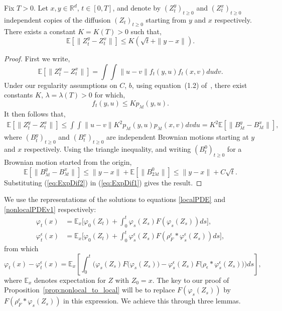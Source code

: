 \documentclass[EJP]{ejpecp} %
\newcommand{\IE}{\mathbb E}
\begin{document}
\begin{lemma} \label{regularityForX2}
Fix $T>0$. Let $x,y \in \mathbb{R}^d$, $t \in [0,T]$, and denote by 
$(Z_t^y)_{t\geq 0}$ and $(Z_t^x)_{t\geq 0}$ independent copies of the 
diffusion $(Z_t)_{t\geq 0}$ starting 
from $y$ and $x$ respectively. There exists a constant $K=K(T)>0$ such that, 
\[ \IE[\|Z_t^y-Z_t^x\|] \leq K(\sqrt{t} + \|y-x\|). \]
\end{lemma}
\begin{proof}
First we write, 
\[ \IE[\|Z_t^y-Z_t^x\|]  = \int \int \|u-v\| f_t(y,u) f_t(x,v) du dv . \]
Under our regularity assumptions on $C$, $b$, using equation~(1.2)
of~\cite{sheu:1991}, there exist constants $K$, $\lambda =\lambda (T)>0$ 
for which,
\[ f_t(y,u) \leq K  p_{\lambda  t}(y,u). \]
It then follows that,
\begin{align}
  \IE[\|Z_t^y-Z_t^x\|]  \leq \int \int \|u-v\| K^2 p_{\lambda  t}(y,u) 
p_{\lambda  t}(x,v) dv du = K^2 \IE[\|B_{\lambda  t}^y-B_{\lambda  t}^x\|], 
\label{eq:ExpDif1}
\end{align}
where $(B_t^y)_{t\geq 0}$ and $(B_t^x)_{t\geq 0}$ are 
independent Brownian motions starting at $y$ and $x$ respectively. 
Using the triangle inequality, and writing $(B^0_t)_{t\geq 0}$ for a 
Brownian motion started from the origin,
\begin{equation}
\IE[\|B_{\lambda  t}^y-B_{\lambda  t}^x\|]
	\leq \|y-x\|+\IE[\|B^0_{2\lambda t}\|] 
\leq \|y-x\|+C\sqrt{t}. \label{eq:ExpDif2}
\end{equation}
Substituting (\ref{eq:ExpDif2}) in (\ref{eq:ExpDif1}) gives the result.
\end{proof}

We use the representations of the solutions to equations \eqref{localPDE} and \eqref{nonlocalPDEv1} respectively:
\begin{align}
\varphi_t(x) &= \IE_x\Big[\varphi_0(Z_t) 
+ \int_0^t \varphi_s(Z_s)F(\varphi_s(Z_s)) ds\Big], \label{FK:varphi} \\
\varphi^\epsilon_t(x) &= \IE_x\Big[\varphi_0(Z_t) 
+ \int_0^t \varphi^\epsilon_s(Z_s)F(\rho^\epsilon_F*\varphi^\epsilon_s(Z_s)) ds\Big],
\end{align}
from which
\begin{equation} 
\varphi_t(x) - \varphi^\epsilon_t(x) = 
\IE_x\left[ \int_0^t \Big(\varphi_s(Z_s)F\big(\varphi_s(Z_s)\big)
-\varphi^\epsilon_s(Z_s)F\big(\rho_\epsilon*\varphi^\epsilon_s(Z_s)\big)\Big) ds \right] ,
\label{FK:diferencesVarphis}
\end{equation}
where $\IE_x$ denotes expectation for $Z$ with $Z_0 = x$.
The key to our proof of Proposition~\ref{prop:nonlocal_to_local}
will be to replace $F(\varphi_s(Z_s))$ by $F(\rho^\epsilon_F*\varphi_s(Z_s))$ 
in this expression. 
We achieve this through three lemmas.
\end{document}
